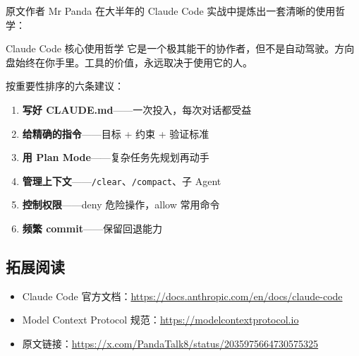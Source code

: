 \documentclass[a4paper]{article}
\begin{document}
原文作者 Mr Panda 在大半年的 Claude Code 实战中提炼出一套清晰的使用哲学：

\begin{importantbox}{Claude Code 核心使用哲学}
它是一个极其能干的协作者，但不是自动驾驶。方向盘始终在你手里。工具的价值，永远取决于使用它的人。
\end{importantbox}

按重要性排序的六条建议：

\begin{enumerate}[leftmargin=1.5em]
  \item \textbf{写好 CLAUDE.md}——一次投入，每次对话都受益
  \item \textbf{给精确的指令}——目标 + 约束 + 验证标准
  \item \textbf{用 Plan Mode}——复杂任务先规划再动手
  \item \textbf{管理上下文}——\texttt{/clear}、\texttt{/compact}、子 Agent
  \item \textbf{控制权限}——deny 危险操作，allow 常用命令
  \item \textbf{频繁 commit}——保留回退能力
\end{enumerate}

\subsection{拓展阅读}

\begin{itemize}[leftmargin=1.5em]
  \item Claude Code 官方文档：\url{https://docs.anthropic.com/en/docs/claude-code}
  \item Model Context Protocol 规范：\url{https://modelcontextprotocol.io}
  \item 原文链接：\url{https://x.com/PandaTalk8/status/2035975664730575325}
\end{itemize}
\end{document}
